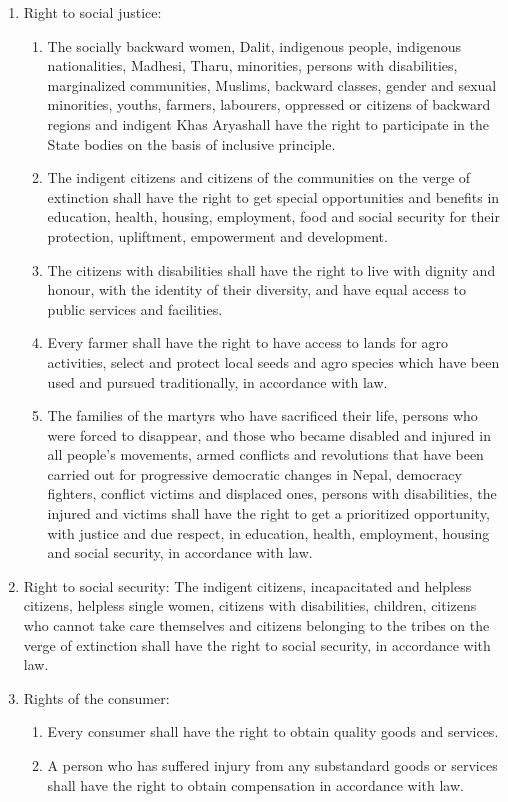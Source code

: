 \begin{questions}
\begin{solution}
\begin{enumerate}
\item Right to social justice:
\begin{enumerate}
    \item The socially backward women, Dalit, indigenous people, indigenous nationalities, Madhesi, Tharu, minorities, persons with disabilities, marginalized communities, Muslims, backward classes, gender and sexual minorities, youths, farmers, labourers, oppressed or citizens of backward regions and indigent Khas Aryashall have the right to participate in the State bodies on the basis of inclusive principle.
    \item The indigent citizens and citizens of the communities on the verge of extinction shall have the right to get special opportunities and benefits in education, health, housing, employment, food and social security for their protection, upliftment, empowerment and development.
    \item The citizens with disabilities shall have the right to live with dignity and honour, with the identity of their diversity, and have equal access to public services and facilities.
    \item Every farmer shall have the right to have access to lands for agro activities, select and protect local seeds and agro species which have been used and pursued traditionally, in accordance with law.
    \item The families of the martyrs who have sacrificed their life, persons who were forced to disappear, and those who became disabled and injured in all people's movements, armed conflicts and revolutions that have been carried out for progressive democratic changes in Nepal, democracy fighters, conflict victims and displaced ones, persons with disabilities, the injured and victims shall have the right to get a prioritized opportunity, with justice and due respect, in education, health, employment, housing and social security, in accordance with law.
\end{enumerate}

\item Right to social security: The indigent citizens, incapacitated and helpless citizens, helpless single women, citizens with disabilities, children, citizens who cannot take care themselves and citizens belonging to the tribes on the verge of extinction shall have the right to social security, in accordance with law.

\item Rights of the consumer: 
\begin{enumerate}
    \item Every consumer shall have the right to obtain quality goods and services.
    \item A person who has suffered injury from any substandard goods or services shall have the right to obtain compensation in accordance with law.
\end{enumerate}


\end{enumerate}
\end{solution}
\end{questions}
